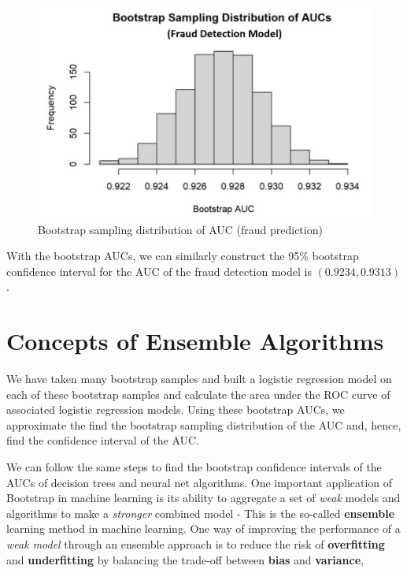 \documentclass[
]{book}
\begin{document}
\begin{figure}

{\centering \includegraphics[width=0.8\linewidth]{img09/w09-BootstrapAUCFraudPred} 

}

\caption{Bootstrap sampling distribution of AUC (fraud prediction)}\label{fig:unnamed-chunk-228}
\end{figure}

With the bootstrap AUCs, we can similarly construct the 95\% bootstrap confidence interval for the AUC of the fraud detection model is \((0.9234, 0.9313 )\).

\hfill\break

\hypertarget{concepts-of-ensemble-algorithms}{%
\section{Concepts of Ensemble Algorithms}\label{concepts-of-ensemble-algorithms}}

We have taken many bootstrap samples and built a logistic regression model on each of these bootstrap samples and calculate the area under the ROC curve of associated logistic regression models. Using these bootstrap AUCs, we approximate the find the bootstrap sampling distribution of the AUC and, hence, find the confidence interval of the AUC.

We can follow the same steps to find the bootstrap confidence intervals of the AUCs of decision trees and neural net algorithms. One important application of Bootstrap in machine learning is its ability to aggregate a set of \emph{weak} models and algorithms to make a \emph{stronger} combined model - This is the so-called \textbf{ensemble} learning method in machine learning. One way of improving the performance of a \emph{weak model} through an ensemble approach is to reduce the risk of \textbf{overfitting} and \textbf{underfitting} by balancing the trade-off between \textbf{bias} and \textbf{variance},
\end{document}
